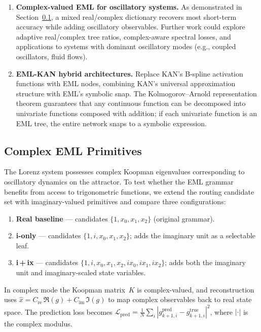 \documentclass[11pt]{article}
\newcommand{\cL}{\mathcal{L}}
\begin{document}
\begin{enumerate}
  \item \textbf{Complex-valued EML for oscillatory systems.}  As demonstrated
    in Section~\ref{sec:complex-eml}, a mixed real/complex dictionary recovers
    most short-term accuracy while adding oscillatory observables.
    Further work could explore adaptive real/complex tree ratios,
    complex-aware spectral losses, and applications to systems with
    dominant oscillatory modes (e.g., coupled oscillators, fluid flows).

  \item \textbf{EML-KAN hybrid architectures.}  Replace KAN's B-spline
    activation functions \citep{liu2025kan} with EML nodes, combining KAN's
    universal approximation structure with EML's symbolic snap.  The
    Kolmogorov--Arnold representation theorem guarantees that any continuous
    function can be decomposed into univariate functions composed with
    addition; if each univariate function is an EML tree, the entire network
    snaps to a symbolic expression.
\end{enumerate}


\subsection{Complex EML Primitives}
\label{sec:complex-eml}

The Lorenz system possesses complex Koopman eigenvalues corresponding to
oscillatory dynamics on the attractor.  To test whether the EML grammar
benefits from access to trigonometric functions, we extend the routing
candidate set with imaginary-valued primitives and compare three
configurations:

\begin{enumerate}
  \item \textbf{Real baseline} --- candidates $\{1, x_0, x_1, x_2\}$ (original grammar).
  \item \textbf{i-only} --- candidates $\{1, i, x_0, x_1, x_2\}$; adds the
    imaginary unit as a selectable leaf.
  \item \textbf{i\,+\,ix} --- candidates $\{1, i, x_0, x_1, x_2, ix_0, ix_1, ix_2\}$;
    adds both the imaginary unit and imaginary-scaled state variables.
\end{enumerate}

\noindent
In complex mode the Koopman matrix~$K$ is complex-valued, and
reconstruction uses $\hat{x} = C_{\text{re}}\,\Re(g) + C_{\text{im}}\,\Im(g)$
to map complex observables back to real state space.
The prediction loss becomes
$\cL_{\text{pred}} = \tfrac{1}{N}\sum_i |g_{k+1,i}^{\text{pred}}
  - g_{k+1,i}^{\text{true}}|^2$,
where $|\cdot|$ is the complex modulus.
\end{document}
